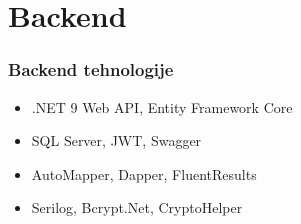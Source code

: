 \documentclass[aspectratio=169]{beamer}
\begin{document}
\section{Backend}

\begin{frame}
    \frametitle{Backend tehnologije}
    \begin{itemize}
        \item .NET 9 Web API, Entity Framework Core
        \item SQL Server, JWT, Swagger
        \item AutoMapper, Dapper, FluentResults
        \item Serilog, Bcrypt.Net, CryptoHelper
    \end{itemize}
\end{frame}
\end{document}
